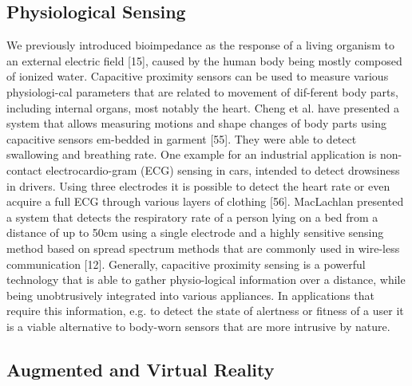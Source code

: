 \subsection{Physiological Sensing}
We previously introduced bioimpedance as the response of a living organism to an external electric field [15], caused by the human body being mostly composed of ionized water. Capacitive proximity sensors can be used to measure various physiologi-cal parameters that are related to movement of dif-ferent body parts, including internal organs, most notably the heart. Cheng et al. have presented a system that allows measuring motions and shape changes of body parts using capacitive sensors em-bedded in garment [55]. They were able to detect swallowing and breathing rate. One example for an industrial application is non-contact electrocardio-gram (ECG) sensing in cars, intended to detect drowsiness in drivers. Using three electrodes it is possible to detect the heart rate or even acquire a full ECG through various layers of clothing [56]. MacLachlan presented a system that detects the respiratory rate of a person lying on a bed from a distance of up to 50cm using a single electrode and a highly sensitive sensing method based on spread spectrum methods that are commonly used in wire-less communication [12].
Generally, capacitive proximity sensing is a powerful technology that is able to gather physio-logical information over a distance, while being unobtrusively integrated into various appliances. In applications that require this information, e.g. to detect the state of alertness or fitness of a user it is a viable alternative to body-worn sensors that are more intrusive by nature.

\subsection{Augmented and Virtual Reality}


